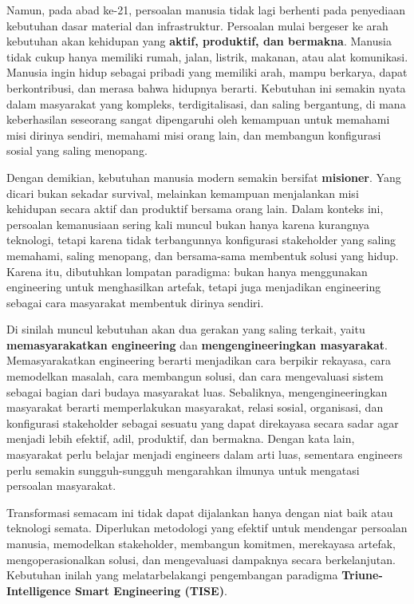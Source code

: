 \documentclass[
  letterpaper,
  DIV=11,
  numbers=noendperiod]{scrreprt}
\begin{document}
Namun, pada abad ke-21, persoalan manusia tidak lagi berhenti pada
penyediaan kebutuhan dasar material dan infrastruktur. Persoalan mulai
bergeser ke arah kebutuhan akan kehidupan yang \textbf{aktif, produktif,
dan bermakna}. Manusia tidak cukup hanya memiliki rumah, jalan, listrik,
makanan, atau alat komunikasi. Manusia ingin hidup sebagai pribadi yang
memiliki arah, mampu berkarya, dapat berkontribusi, dan merasa bahwa
hidupnya berarti. Kebutuhan ini semakin nyata dalam masyarakat yang
kompleks, terdigitalisasi, dan saling bergantung, di mana keberhasilan
seseorang sangat dipengaruhi oleh kemampuan untuk memahami misi dirinya
sendiri, memahami misi orang lain, dan membangun konfigurasi sosial yang
saling menopang.

Dengan demikian, kebutuhan manusia modern semakin bersifat
\textbf{misioner}. Yang dicari bukan sekadar survival, melainkan
kemampuan menjalankan misi kehidupan secara aktif dan produktif bersama
orang lain. Dalam konteks ini, persoalan kemanusiaan sering kali muncul
bukan hanya karena kurangnya teknologi, tetapi karena tidak terbangunnya
konfigurasi stakeholder yang saling memahami, saling menopang, dan
bersama-sama membentuk solusi yang hidup. Karena itu, dibutuhkan
lompatan paradigma: bukan hanya menggunakan engineering untuk
menghasilkan artefak, tetapi juga menjadikan engineering sebagai cara
masyarakat membentuk dirinya sendiri.

Di sinilah muncul kebutuhan akan dua gerakan yang saling terkait, yaitu
\textbf{memasyarakatkan engineering} dan \textbf{mengengineeringkan
masyarakat}. Memasyarakatkan engineering berarti menjadikan cara
berpikir rekayasa, cara memodelkan masalah, cara membangun solusi, dan
cara mengevaluasi sistem sebagai bagian dari budaya masyarakat luas.
Sebaliknya, mengengineeringkan masyarakat berarti memperlakukan
masyarakat, relasi sosial, organisasi, dan konfigurasi stakeholder
sebagai sesuatu yang dapat direkayasa secara sadar agar menjadi lebih
efektif, adil, produktif, dan bermakna. Dengan kata lain, masyarakat
perlu belajar menjadi engineers dalam arti luas, sementara engineers
perlu semakin sungguh-sungguh mengarahkan ilmunya untuk mengatasi
persoalan masyarakat.

Transformasi semacam ini tidak dapat dijalankan hanya dengan niat baik
atau teknologi semata. Diperlukan metodologi yang efektif untuk
mendengar persoalan manusia, memodelkan stakeholder, membangun komitmen,
merekayasa artefak, mengoperasionalkan solusi, dan mengevaluasi
dampaknya secara berkelanjutan. Kebutuhan inilah yang melatarbelakangi
pengembangan paradigma \textbf{Triune-Intelligence Smart Engineering
(TISE)}.
\end{document}
